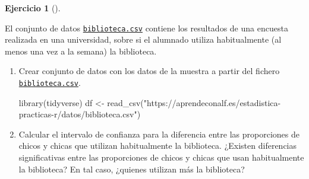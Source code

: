 \documentclass[
  a4paper,
]{scrreport}
\newenvironment{Shaded}{\begin{snugshade}}{\end{snugshade}}
\newcommand{\FunctionTok}[1]{\textcolor[rgb]{0.28,0.35,0.67}{#1}}
\newcommand{\NormalTok}[1]{\textcolor[rgb]{0.00,0.23,0.31}{#1}}
\newcommand{\OtherTok}[1]{\textcolor[rgb]{0.00,0.23,0.31}{#1}}
\newcommand{\StringTok}[1]{\textcolor[rgb]{0.13,0.47,0.30}{#1}}
\theoremstyle{definition}
\newtheorem{exercise}{Ejercicio}[chapter]
\theoremstyle{remark}
\begin{document}
\begin{exercise}[]\protect\hypertarget{exr-intervalo-comparacion-proporciones-uso-biblioteca}{}\label{exr-intervalo-comparacion-proporciones-uso-biblioteca}

El conjunto de datos
\href{https://aprendeconalf.es/estadistica-practicas-r/datos/biblioteca.csv}{\texttt{biblioteca.csv}}
contiene los resultados de una encuesta realizada en una universidad,
sobre si el alumnado utiliza habitualmente (al menos una vez a la
semana) la biblioteca.

\begin{enumerate}
\def\labelenumi{\alph{enumi}.}
\item
  Crear conjunto de datos con los datos de la muestra a partir del
  fichero
  \href{https://aprendeconalf.es/estadistica-practicas-r/datos/biblioteca.csv}{\texttt{biblioteca.csv}}.

  \begin{tcolorbox}[enhanced jigsaw, coltitle=black, left=2mm, colback=white, leftrule=.75mm, toptitle=1mm, breakable, bottomrule=.15mm, titlerule=0mm, bottomtitle=1mm, title=\textcolor{quarto-callout-tip-color}{\faLightbulb}\hspace{0.5em}{Solución}, arc=.35mm, toprule=.15mm, rightrule=.15mm, colframe=quarto-callout-tip-color-frame, opacityback=0, colbacktitle=quarto-callout-tip-color!10!white, opacitybacktitle=0.6]

\begin{Shaded}
\begin{Highlighting}[]
\FunctionTok{library}\NormalTok{(tidyverse)}
\NormalTok{df }\OtherTok{\textless{}{-}} \FunctionTok{read\_csv}\NormalTok{(}\StringTok{"https://aprendeconalf.es/estadistica{-}practicas{-}r/datos/biblioteca.csv"}\NormalTok{)}
\end{Highlighting}
\end{Shaded}

  \end{tcolorbox}
\item
  Calcular el intervalo de confianza para la diferencia entre las
  proporciones de chicos y chicas que utilizan habitualmente la
  biblioteca. ¿Existen diferencias significativas entre las proporciones
  de chicos y chicas que usan habitualmente la biblioteca? En tal caso,
  ¿quienes utilizan más la biblioteca?

  \begin{tcolorbox}[enhanced jigsaw, coltitle=black, left=2mm, colback=white, leftrule=.75mm, toptitle=1mm, breakable, bottomrule=.15mm, titlerule=0mm, bottomtitle=1mm, title=\textcolor{quarto-callout-tip-color}{\faLightbulb}\hspace{0.5em}{Solución}, arc=.35mm, toprule=.15mm, rightrule=.15mm, colframe=quarto-callout-tip-color-frame, opacityback=0, colbacktitle=quarto-callout-tip-color!10!white, opacitybacktitle=0.6]


\end{tcolorbox}
\end{enumerate}
\end{exercise}
\end{document}
